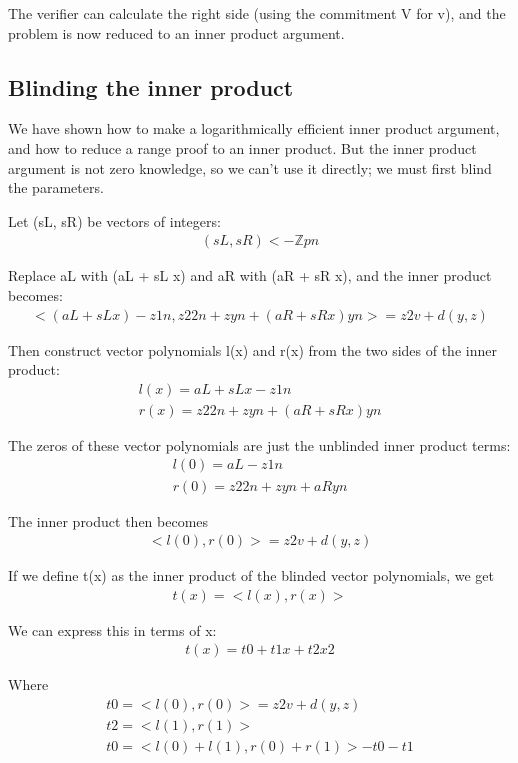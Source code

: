 \documentclass{article}
\begin{document}
The verifier can calculate the right side (using the commitment V for v), and the problem is now reduced to an inner product argument.


\subsection{Blinding the inner product}

We have shown how to make a logarithmically efficient inner product argument, and how to reduce a range proof to an inner product.  But the inner product argument is not zero knowledge, so we can’t use it directly; we must first blind the parameters.

Let (sL, sR) be vectors of integers:
\begin{eqnarray}
  (sL, sR) <- \mathbb{Z}pn
\end{eqnarray}

Replace aL with (aL + sL x) and aR with (aR + sR x), and the inner product becomes:
\begin{eqnarray}
  <(aL + sL x) - z 1n, z2 2n + z yn + (aR+ sR x)yn> = z2 v + d(y,z)
\end{eqnarray}

Then construct vector polynomials l(x) and r(x) from the two sides of the inner product:
\begin{eqnarray}
  l(x) = aL + sL x - z 1n\\
  r(x) = z2 2n + z yn + (aR+ sR x)yn
\end{eqnarray}

The zeros of these vector polynomials are just the unblinded inner product terms:
\begin{eqnarray}
  l(0) = aL - z 1n\\
  r(0) = z2 2n + z yn + aRyn
\end{eqnarray}

The inner product then becomes
\begin{eqnarray}
  <l(0), r(0)> = z2 v + d(y,z)
\end{eqnarray}

If we define t(x) as the inner product of the blinded vector polynomials, we get
\begin{eqnarray}
  t(x) = <l(x), r(x)> 
\end{eqnarray}

We can express this in terms of x:
\begin{eqnarray}
  t(x) = t0 + t1 x + t2 x2
\end{eqnarray}

Where
\begin{eqnarray}
  t0 = <l(0), r(0)> = z2 v + d(y,z)\\
  t2 = <l(1), r(1)>\\
  t0 = <l(0) + l(1), r(0) + r(1)> - t0 - t1
\end{eqnarray}
\end{document}
